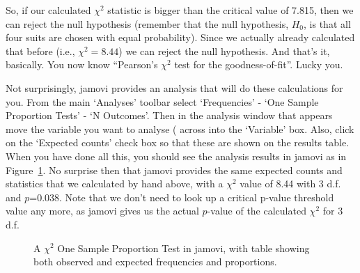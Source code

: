 So, if our calculated $\chi^2$ statistic is bigger than the critical value of 7.815, then we can reject the null hypothesis (remember that the null hypothesis, $H_0$, is that all four suits are chosen with equal probability). Since we actually already calculated that before (i.e., $\chi^2 = 8.44$) we can reject the null hypothesis.  And that's it, basically. You now know ``Pearson's $\chi^2$ test for the goodness-of-fit''. Lucky you.


Not surprisingly, jamovi provides an analysis that will do these calculations for you. From the main `Analyses' toolbar select `Frequencies' - `One Sample Proportion Tests' - `N Outcomes'. Then in the analysis window that appears move the variable you want to analyse ( across into the `Variable' box. Also, click on the `Expected counts' check box so that these are shown on the results table. When you have done all this, you should see the analysis results in jamovi as in Figure~\ref{fig:chisquare.analysis1}. No surprise then that jamovi provides the same expected counts and statistics that we calculated by hand above, with a $\chi^2$ value of 8.44 with 3 d.f. and $p$=0.038. Note that we don't need to look up a critical p-value threshold value any more, as jamovi gives us the actual $p$-value of the calculated $\chi^2$ for 3 d.f.  

\begin{figure}
\begin{center}
\caption{A $\chi^2$ One Sample Proportion Test in jamovi, with table showing both observed and expected frequencies and proportions.}
\label{fig:chisquare.analysis1}
\HR
\end{center}
\end{figure}


